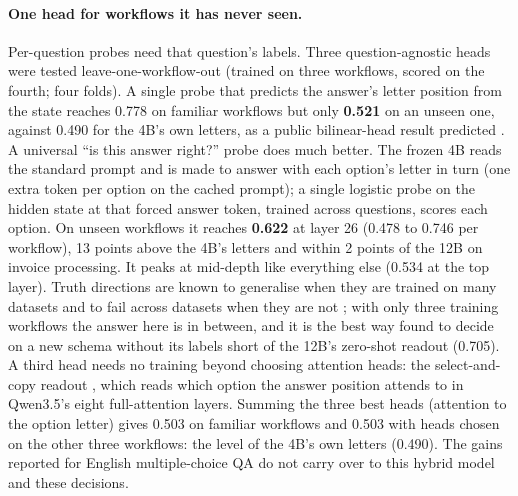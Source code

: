 \documentclass[11pt,a4paper]{article}
\begin{document}
\paragraph{One head for workflows it has never seen.} Per-question probes need that question's labels. Three question-agnostic heads were tested leave-one-workflow-out (trained on three workflows, scored on the fourth; four folds). A single probe that predicts the answer's letter position from the state reaches 0.778 on familiar workflows but only \textbf{0.521} on an unseen one, against 0.490 for the 4B's own letters, as a public bilinear-head result predicted \cite{chenhf}. A universal ``is this answer right?'' probe does much better. The frozen 4B reads the standard prompt and is made to answer with each option's letter in turn (one extra token per option on the cached prompt); a single logistic probe on the hidden state at that forced answer token, trained across questions, scores each option. On unseen workflows it reaches \textbf{0.622} at layer 26 (0.478 to 0.746 per workflow), 13 points above the 4B's letters and within 2 points of the 12B on invoice processing. It peaks at mid-depth like everything else (0.534 at the top layer). Truth directions are known to generalise when they are trained on many datasets \cite{truthhyper} and to fail across datasets when they are not \cite{orgad}; with only three training workflows the answer here is in between, and it is the best way found to decide on a new schema without its labels short of the 12B's zero-shot readout (0.705). A third head needs no training beyond choosing attention heads: the select-and-copy readout \cite{selectcopy,wiegreffe}, which reads which option the answer position attends to in Qwen3.5's eight full-attention layers. Summing the three best heads (attention to the option letter) gives 0.503 on familiar workflows and 0.503 with heads chosen on the other three workflows: the level of the 4B's own letters (0.490). The gains reported for English multiple-choice QA do not carry over to this hybrid model and these decisions.
\end{document}
